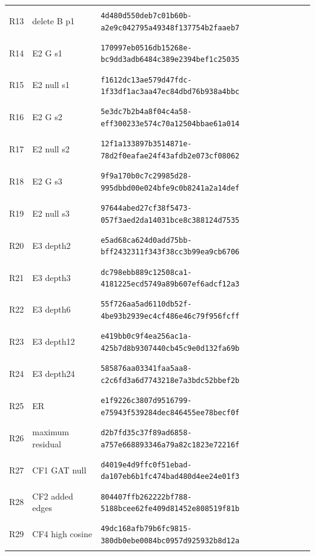 \begin{longtable}{@{}l>{\raggedright\arraybackslash}p{3.5cm}p{10.8cm}@{}}
\hypertarget{R13}{R13} & delete B p1 & {\fontsize{8.8}{11}\selectfont\texttt{4d480d550deb7c01b60b-a2e9c042795a49348f137754b2faaeb7}} \\
\hypertarget{R14}{R14} & E2 G s1 & {\fontsize{8.8}{11}\selectfont\texttt{170997eb0516db15268e-bc9dd3adb6484c389e2394bef1c25035}} \\
\hypertarget{R15}{R15} & E2 null s1 & {\fontsize{8.8}{11}\selectfont\texttt{f1612dc13ae579d47fdc-1f33df1ac3aa47ec84dbd76b938a4bbc}} \\
\hypertarget{R16}{R16} & E2 G s2 & {\fontsize{8.8}{11}\selectfont\texttt{5e3dc7b2b4a8f04c4a58-eff300233e574c70a12504bbae61a014}} \\
\hypertarget{R17}{R17} & E2 null s2 & {\fontsize{8.8}{11}\selectfont\texttt{12f1a133897b3514871e-78d2f0eafae24f43afdb2e073cf08062}} \\
\hypertarget{R18}{R18} & E2 G s3 & {\fontsize{8.8}{11}\selectfont\texttt{9f9a170b0c7c29985d28-995dbbd00e024bfe9c0b8241a2a14def}} \\
\hypertarget{R19}{R19} & E2 null s3 & {\fontsize{8.8}{11}\selectfont\texttt{97644abed27cf38f5473-057f3aed2da14031bce8c388124d7535}} \\
\hypertarget{R20}{R20} & E3 depth2 & {\fontsize{8.8}{11}\selectfont\texttt{e5ad68ca624d0add75bb-bff2432311f343f38cc3b99ea9cb6706}} \\
\hypertarget{R21}{R21} & E3 depth3 & {\fontsize{8.8}{11}\selectfont\texttt{dc798ebb889c12508ca1-4181225ecd5749a89b607ef6adcf12a3}} \\
\hypertarget{R22}{R22} & E3 depth6 & {\fontsize{8.8}{11}\selectfont\texttt{55f726aa5ad6110db52f-4be93b2939ec4cf486e46c79f956fcff}} \\
\hypertarget{R23}{R23} & E3 depth12 & {\fontsize{8.8}{11}\selectfont\texttt{e419bb0c9f4ea256ac1a-425b7d8b9307440cb45c9e0d132fa69b}} \\
\hypertarget{R24}{R24} & E3 depth24 & {\fontsize{8.8}{11}\selectfont\texttt{585876aa03341faa5aa8-c2c6fd3a6d7743218e7a3bdc52bbef2b}} \\
\hypertarget{R25}{R25} & ER & {\fontsize{8.8}{11}\selectfont\texttt{e1f9226c3807d9516799-e75943f539284dec846455ee78becf0f}} \\
\hypertarget{R26}{R26} & maximum residual & {\fontsize{8.8}{11}\selectfont\texttt{d2b7fd35c37f89ad6858-a757e668893346a79a82c1823e72216f}} \\
\hypertarget{R27}{R27} & CF1 GAT null & {\fontsize{8.8}{11}\selectfont\texttt{d4019e4d9ffc0f51ebad-da107eb6b1fc474bad480d4ee24e01f3}} \\
\hypertarget{R28}{R28} & CF2 added edges & {\fontsize{8.8}{11}\selectfont\texttt{804407ffb262222bf788-5188bcee62fe409d81452e808519f81b}} \\
\hypertarget{R29}{R29} & CF4 high cosine & {\fontsize{8.8}{11}\selectfont\texttt{49dc168afb79b6fc9815-380db0ebe0084bc0957d925932b8d12a}} \\
\bottomrule\end{longtable}\endgroup
